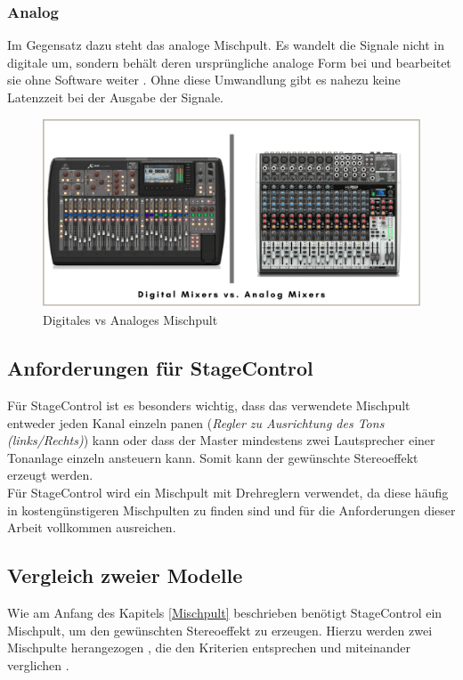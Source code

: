 \subsubsection{Analog}
Im Gegensatz dazu steht das analoge Mischpult. Es wandelt die Signale nicht in digitale um, sondern behält deren ursprüngliche analoge Form bei und bearbeitet sie ohne Software weiter \parencite{MischpultAnalogDigital}. Ohne diese Umwandlung gibt es nahezu keine Latenzzeit bei der Ausgabe der Signale. \\


\begin{figure}[H]
	\centering
	\includegraphics[width=0.8\linewidth]{images/DigitalMixerAnalogMixer.png}
	\caption[Digitales vs Analoges Mischpult]{Digitales vs Analoges Mischpult}
	\label{fig:Digitales vs. Analoges Mischpult}
\end{figure}


\subsection{Anforderungen für StageControl}
Für StageControl ist es besonders wichtig, dass das verwendete Mischpult entweder jeden Kanal einzeln panen (\textit{Regler zu Ausrichtung des Tons (links/Rechts)}) kann oder dass der Master mindestens zwei Lautsprecher einer Tonanlage einzeln ansteuern kann. Somit kann der gewünschte Stereoeffekt erzeugt werden. \\
Für StageControl wird ein Mischpult mit Drehreglern verwendet, da diese häufig in kostengünstigeren Mischpulten zu finden sind und für die Anforderungen dieser Arbeit vollkommen ausreichen. 



\subsection{Vergleich zweier Modelle}
Wie am Anfang des Kapitels \ref{Mischpult} beschrieben benötigt StageControl ein Mischpult, um den gewünschten Stereoeffekt zu erzeugen. Hierzu werden zwei Mischpulte herangezogen \parencite{MischpultKriterien1204}, die den Kriterien entsprechen und miteinander verglichen  \parencite{MischpultKriterien1402}.

